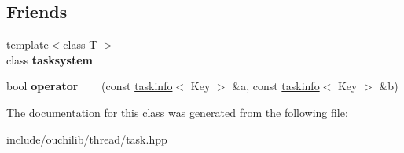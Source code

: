\subsection*{Friends}
\begin{DoxyCompactItemize}
\item 
\mbox{\label{classouchi_1_1task_1_1taskinfo_aae71502661188bddec020b93d06f644c}} 
{\footnotesize template$<$class T $>$ }\\class {\bfseries tasksystem}
\item 
\mbox{\label{classouchi_1_1task_1_1taskinfo_ab38a0c0d73b74aff55a39e1c04512159}} 
bool {\bfseries operator==} (const \mbox{\hyperlink{classouchi_1_1task_1_1taskinfo}{taskinfo}}$<$ Key $>$ \&a, const \mbox{\hyperlink{classouchi_1_1task_1_1taskinfo}{taskinfo}}$<$ Key $>$ \&b)
\end{DoxyCompactItemize}


The documentation for this class was generated from the following file\+:\begin{DoxyCompactItemize}
\item 
include/ouchilib/thread/task.\+hpp\end{DoxyCompactItemize}
